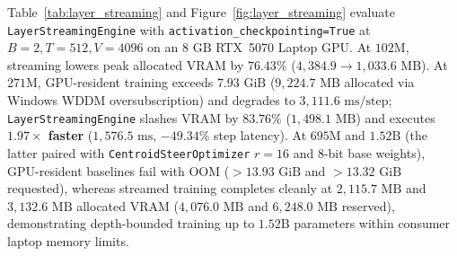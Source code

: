 \documentclass[10pt,twocolumn,letterpaper]{article}
\begin{document}
Table~\ref{tab:layer_streaming} and Figure~\ref{fig:layer_streaming} evaluate \texttt{LayerStreamingEngine} with \texttt{activation\_checkpointing=True} at $B=2, T=512, V=4096$ on an $8\text{ GB}$ RTX~5070 Laptop GPU. At $102\text{M}$, streaming lowers peak allocated VRAM by $76.43\%$ ($4,384.9 \to 1,033.6\text{ MB}$). At $271\text{M}$, GPU-resident training exceeds $7.93\text{ GiB}$ ($9,224.7\text{ MB}$ allocated via Windows WDDM oversubscription) and degrades to $3,111.6\text{ ms/step}$; \texttt{LayerStreamingEngine} slashes VRAM by $83.76\%$ ($1,498.1\text{ MB}$) and executes \textbf{$1.97\times$ faster} ($1,576.5\text{ ms}$, $-49.34\%$ step latency). At $695\text{M}$ and $1.52\text{B}$ (the latter paired with \texttt{CentroidSteerOptimizer} $r=16$ and 8-bit base weights), GPU-resident baselines fail with OOM ($>13.93\text{ GiB}$ and $>13.32\text{ GiB}$ requested), whereas streamed training completes cleanly at $2,115.7\text{ MB}$ and $3,132.6\text{ MB}$ allocated VRAM ($4,076.0\text{ MB}$ and $6,248.0\text{ MB}$ reserved), demonstrating depth-bounded training up to $1.52\text{B}$ parameters within consumer laptop memory limits.

\begin{table}[t]
\centering
\small
\caption{\textbf{Activation-Checkpointed \texttt{LayerStreamingEngine} vs.\ GPU-Resident Training on 8 GB RTX 5070} ($B=2, T=512, V=4096$, BF16; \texttt{layer\_streaming\_results.json}). All streamed runs stay cleanly inside $7.93\text{ GiB}$ physical VRAM.}
\label{tab:layer_streaming}
\end{table}
\end{document}
